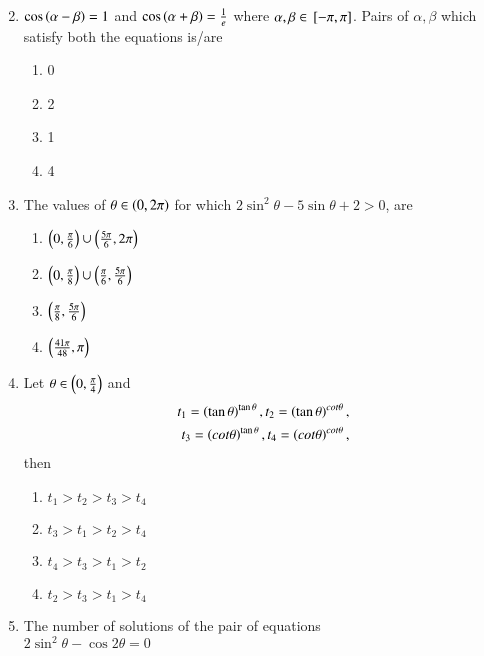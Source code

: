 \documentclass[journal,12pt,twocolumn,article]{IEEEtran}
\theoremstyle{remark}
\begin{document}
\begin{enumerate}[start = 20]
\begin{multicols}{2}
\end{multicols}
\item $\cos\left(\alpha - \beta\right)=1$ and $\cos\left(\alpha + \beta\right)=\frac{1}{e}$ where $\alpha, \beta \in {}\left[-\pi,\pi\right]$. Pairs of $\alpha, \beta$ which satisfy both the equations is/are
\hfill{}
\begin{multicols}{2}
\begin{enumerate}
\item 0
\item 2
\columnbreak
\item 1
\item 4 
\end{enumerate}
\end{multicols}
\item The values of $\theta \in \left(0,2\pi\right)$ for which $2\sin^2\theta - 5\sin\theta + 2 > 0$, are
\hfill{}
\begin{multicols}{2}
\begin{enumerate}
\item $\left(0,\frac{\pi}{6}\right)\cup\left(\frac{5\pi}{6},2\pi\right)$
\item $\left(0,\frac{\pi}{8}\right)\cup\left(\frac{\pi}{6},\frac{5\pi}{6}\right)$
\columnbreak
\item $\left(\frac{\pi}{8},\frac{5\pi}{6}\right)$
\item $\left(\frac{41\pi}{48},\pi\right)$
\end{enumerate}
\end{multicols}
\item Let $\theta \in \left(0,\frac{\pi}{4}\right)$ and 
\begin{align*}
t_1 = \left(\tan\theta\right)^{\tan\theta}, t_2 = \left(\tan\theta\right)^{cot\theta},\\t_3 = \left(cot\theta\right)^{\tan\theta}, t_4 = \left(cot\theta\right)^{cot\theta},
\end{align*} then
\hfill{}
\begin{multicols}{2}
\begin{enumerate}
\item $t_1>t_2>t_3>t_4$
\item $t_3>t_1>t_2>t_4$
\columnbreak
\item $t_4>t_3>t_1>t_2$
\item $t_2>t_3>t_1>t_4$
\end{enumerate}
\end{multicols}
\item The number of solutions of the pair of equations\\
$2\sin^2\theta - \cos2\theta = 0$\\

\end{enumerate}
\end{document}
